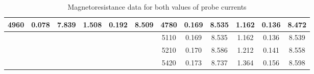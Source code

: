 \begin{table*}[]
\begin{tabular}{|cccccc|cccccc|}
        \multicolumn{1}{|c|}{4960} & \multicolumn{1}{c|}{0.078} & \multicolumn{1}{c|}{7.839} & \multicolumn{1}{c|}{1.508} & \multicolumn{1}{c|}{0.192} & 8.509 & \multicolumn{1}{c|}{4780} & \multicolumn{1}{c|}{0.169} & \multicolumn{1}{c|}{8.535} & \multicolumn{1}{c|}{1.162} & \multicolumn{1}{c|}{0.136} & 8.472 \\ \hline
        \multicolumn{1}{|c|}{} & \multicolumn{1}{c|}{} & \multicolumn{1}{c|}{} & \multicolumn{1}{c|}{} & \multicolumn{1}{c|}{} &  & \multicolumn{1}{c|}{5110} & \multicolumn{1}{c|}{0.169} & \multicolumn{1}{c|}{8.535} & \multicolumn{1}{c|}{1.162} & \multicolumn{1}{c|}{0.136} & 8.539 \\ \hline
        \multicolumn{1}{|c|}{} & \multicolumn{1}{c|}{} & \multicolumn{1}{c|}{} & \multicolumn{1}{c|}{} & \multicolumn{1}{c|}{} &  & \multicolumn{1}{c|}{5210} & \multicolumn{1}{c|}{0.170} & \multicolumn{1}{c|}{8.586} & \multicolumn{1}{c|}{1.212} & \multicolumn{1}{c|}{0.141} & 8.558 \\ \hline
        \multicolumn{1}{|c|}{} & \multicolumn{1}{c|}{} & \multicolumn{1}{c|}{} & \multicolumn{1}{c|}{} & \multicolumn{1}{c|}{} &  & \multicolumn{1}{c|}{5420} & \multicolumn{1}{c|}{0.173} & \multicolumn{1}{c|}{8.737} & \multicolumn{1}{c|}{1.364} & \multicolumn{1}{c|}{0.156} & 8.598 \\ \hline
        \end{tabular}
        \caption{Magnetoresistance data for both values of probe currents}
        \label{trm1}
\end{table*}
